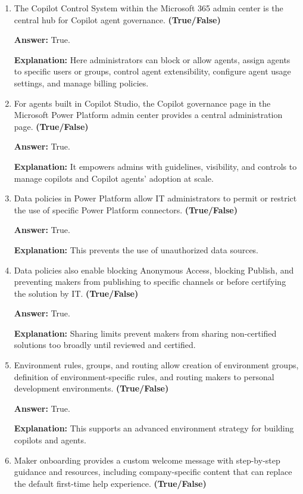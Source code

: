 \documentclass[10pt]{article}
\begin{document}
\begin{enumerate}[leftmargin=*]
\item The Copilot Control System within the Microsoft 365 admin center is the central hub for Copilot agent governance. \textbf{(True/False)}

\textbf{Answer:} True.

\textbf{Explanation:} Here administrators can block or allow agents, assign agents to specific users or groups, control agent extensibility, configure agent usage settings, and manage billing policies.

\item For agents built in Copilot Studio, the Copilot governance page in the Microsoft Power Platform admin center provides a central administration page. \textbf{(True/False)}

\textbf{Answer:} True.

\textbf{Explanation:} It empowers admins with guidelines, visibility, and controls to manage copilots and Copilot agents’ adoption at scale.

\item Data policies in Power Platform allow IT administrators to permit or restrict the use of specific Power Platform connectors. \textbf{(True/False)}

\textbf{Answer:} True.

\textbf{Explanation:} This prevents the use of unauthorized data sources.

\item Data policies also enable blocking Anonymous Access, blocking Publish, and preventing makers from publishing to specific channels or before certifying the solution by IT. \textbf{(True/False)}

\textbf{Answer:} True.

\textbf{Explanation:} Sharing limits prevent makers from sharing non-certified solutions too broadly until reviewed and certified.

\item Environment rules, groups, and routing allow creation of environment groups, definition of environment-specific rules, and routing makers to personal development environments. \textbf{(True/False)}

\textbf{Answer:} True.

\textbf{Explanation:} This supports an advanced environment strategy for building copilots and agents.

\item Maker onboarding provides a custom welcome message with step-by-step guidance and resources, including company-specific content that can replace the default first-time help experience. \textbf{(True/False)}


\end{enumerate}
\end{document}
